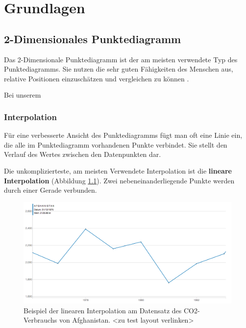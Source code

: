 \chapter{Grundlagen}





\section{2-Dimensionales Punktediagramm}


Das 2-Dimensionale Punktediagramm ist der am meisten verwendete Typ des Punktediagramms. Sie nutzen die sehr guten Fähigkeiten des Menschen aus, relative Positionen einzuschätzen und vergleichen zu können \cite{viz}.

Bei unserem 




\subsection{Interpolation}


Für eine verbesserte Ansicht des Punktediagramms fügt man oft eine Linie ein, die alle im Punktediagramm vorhandenen Punkte verbindet. Sie stellt den Verlauf des Wertes zwischen den Datenpunkten dar.

Die unkomplizierteste, am meisten Verwendete Interpolation ist die \textbf{lineare Interpolation} (Abbildung \ref{fig:linear}). Zwei nebeneinanderliegende Punkte werden durch einer Gerade verbunden.

\begin{figure}[htbp]
	\centering
	\includegraphics[width=0.80\linewidth]{images/linear}
	\caption[Lineare Interpolation]{Beispiel der linearen Interpolation am Datensatz des CO2-Verbrauchs von Afghanistan. <zu test layout verlinken>}
	\label{fig:linear}
\end{figure}

